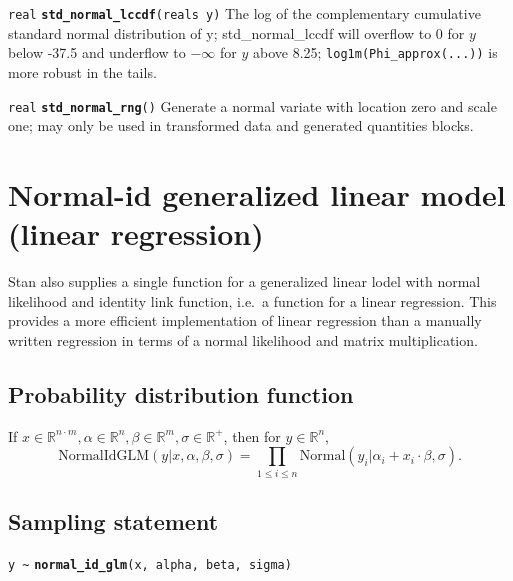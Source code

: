 \documentclass[
  10pt,
]{book}
\begin{document}

\texttt{real} \textbf{\texttt{std\_normal\_lccdf}}\texttt{(reals\ y)}\newline
The log of the complementary cumulative standard normal distribution of y;
std\_normal\_lccdf will overflow to 0 for \(y\) below -37.5 and underflow to
\(-\infty\) for \(y\) above 8.25; \texttt{log1m(Phi\_approx(...))} is more robust in the
tails.


\texttt{real} \textbf{\texttt{std\_normal\_rng}}\texttt{()}\newline
Generate a normal variate with location zero and scale one; may only
be used in transformed data and generated quantities blocks.

\hypertarget{normal-id-glm}{%
\section{Normal-id generalized linear model (linear regression)}\label{normal-id-glm}}

Stan also supplies a single function for a generalized linear lodel
with normal likelihood and identity link function, i.e.~a function
for a linear regression. This provides a more efficient
implementation of linear regression than a manually written regression
in terms of a normal likelihood and matrix multiplication.

\hypertarget{probability-distribution-function}{%
\subsection{Probability distribution function}\label{probability-distribution-function}}

If \(x\in \mathbb{R}^{n\cdot m}, \alpha \in \mathbb{R}^n, \beta\in \mathbb{R}^m, \sigma\in \mathbb{R}^+\), then for \(y \in \mathbb{R}^n\),
\[ \text{NormalIdGLM}(y|x, \alpha, \beta, \sigma) = \prod_{1\leq i
\leq n}\text{Normal}(y_i|\alpha_i + x_i\cdot \beta, \sigma). \]

\hypertarget{sampling-statement-24}{%
\subsection{Sampling statement}\label{sampling-statement-24}}

\texttt{y\ \textasciitilde{}} \textbf{\texttt{normal\_id\_glm}}\texttt{(x,\ alpha,\ beta,\ sigma)}
\end{document}
